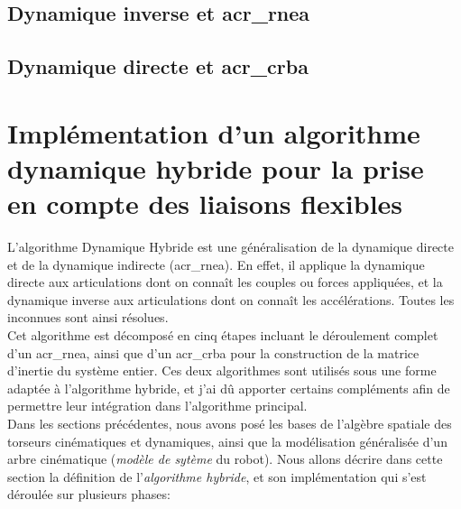 \documentclass{report}
\begin{document}
\section{Dynamique inverse et \gls{acr_rnea}}

\section{Dynamique directe et \gls{acr_crba}}



\chapter{Implémentation d'un algorithme dynamique hybride pour la prise en compte des liaisons flexibles}

L'algorithme Dynamique Hybride est une généralisation de la dynamique directe et de la dynamique indirecte (\gls{acr_rnea}). En effet, il applique la dynamique directe aux articulations dont on connaît les couples ou forces appliquées, et la dynamique inverse aux articulations dont on connaît les accélérations. Toutes les inconnues sont ainsi résolues.\\
Cet algorithme est décomposé en cinq étapes incluant le déroulement complet d'un \gls{acr_rnea}, ainsi que d'un \gls{acr_crba} pour la construction de la matrice d'inertie du système entier. Ces deux algorithmes sont utilisés sous une forme adaptée à l'algorithme hybride, et j'ai dû apporter certains compléments afin de permettre leur intégration dans l'algorithme principal.\\
Dans les sections précédentes, nous avons posé les bases de l'algèbre spatiale des torseurs cinématiques et dynamiques, ainsi que la modélisation généralisée d'un arbre cinématique (\emph{modèle de sytème} du robot). Nous allons décrire dans cette section la définition de l'\emph{algorithme hybride}, et son implémentation qui s'est déroulée sur plusieurs phases:\\
\end{document}
